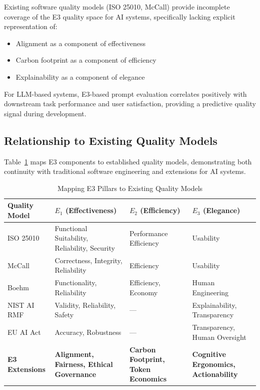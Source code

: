 \begin{hypothesis}
\label{hyp:coverage}
Existing software quality models (ISO 25010, McCall) provide incomplete coverage of the E3 quality space for AI systems, specifically lacking explicit representation of:
\begin{itemize}[leftmargin=2em]
    \item Alignment as a component of effectiveness
    \item Carbon footprint as a component of efficiency
    \item Explainability as a component of elegance
\end{itemize}
\end{hypothesis}

\begin{hypothesis}
\label{hyp:prompt}
For LLM-based systems, E3-based prompt evaluation correlates positively with downstream task performance and user satisfaction, providing a predictive quality signal during development.
\end{hypothesis}

\subsection{Relationship to Existing Quality Models}

Table~\ref{tab:quality_model_mapping} maps E3 components to established quality models, demonstrating both continuity with traditional software engineering and extensions for AI systems.

\begin{table}[t]
\centering
\caption{Mapping E3 Pillars to Existing Quality Models}
\label{tab:quality_model_mapping}
\small
\begin{tabularx}{\textwidth}{@{}l X X X@{}}
\toprule
\textbf{Quality Model} & \textbf{$E_1$ (Effectiveness)} & \textbf{$E_2$ (Efficiency)} & \textbf{$E_3$ (Elegance)} \\
\midrule
ISO 25010 \cite{iso25010:2011} & Functional Suitability, Reliability, Security & Performance Efficiency & Usability \\
McCall \cite{mccall1977factors} & Correctness, Integrity, Reliability & Efficiency & Usability \\
Boehm \cite{boehm1978characteristics} & Functionality, Reliability & Efficiency, Economy & Human Engineering \\
NIST AI RMF \cite{nistairmf2023} & Validity, Reliability, Safety & — & Explainability, Transparency \\
EU AI Act \cite{euaiact2024} & Accuracy, Robustness & — & Transparency, Human Oversight \\
\addlinespace
\textbf{E3 Extensions} & \textbf{Alignment, Fairness, Ethical Governance} & \textbf{Carbon Footprint, Token Economics} & \textbf{Cognitive Ergonomics, Actionability} \\
\bottomrule
\end{tabularx}
\end{table}


